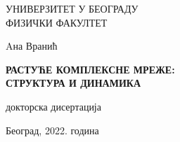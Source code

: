 
\sffamily
{}\selectfont

\begin{center}

\Large{
    УНИВЕРЗИТЕТ У БЕОГРАДУ \\
    ФИЗИЧКИ ФАКУЛТЕТ
}

\vspace{5.5cm}

\Large{
    Aна Вранић
}

\vspace{.5cm}

\LARGE{ \textbf{
    РАСТУЋЕ КОМПЛЕКСНЕ МРЕЖЕ:\\ СТРУКТУРА И ДИНАМИКА
}}

\vspace{.5cm}

\Large{
    докторска дисертација 
    
}
\vspace{9.1cm}
\Large{
    Београд, 2022. година
}
\end{center}

